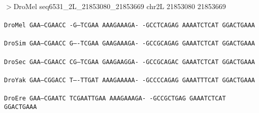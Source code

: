 \documentclass[11pt,twoside,reqno,a4paper]{article}
\begin{document}
\noindent
\newlength{\charwidth}$>$DroMel	seq6531\_2L\_21853080\_21853669	chr2L	21853080	21853669 \\
 \\
\texttt{DroMel	GAA--CGAACC	-G---TCGAA	AAAGAAAGA-	-GCCTCAGAG	AAAATCTCAT	GGACTGAAA\\
\hspace*{7\charwidth}\hspace*{1\charwidth}\hspace*{1\charwidth}\hspace*{1\charwidth}\hspace*{1\charwidth}\hspace*{1\charwidth}\\
DroSim	GAA--CGAACC	G----TCGAA	GAAGAAAGA-	-GCCGCAGAG	GAAATCTCAT	GGACTGAAA\\
\hspace*{7\charwidth}\hspace*{1\charwidth}\hspace*{1\charwidth}\hspace*{1\charwidth}\hspace*{1\charwidth}\hspace*{1\charwidth}\\
DroSec	GAA--CGAACC	CG---TCGAA	GAAGAAGGA-	-GCCGCAGAC	GAAATCTCAT	GGACTGAAA\\
\hspace*{7\charwidth}\hspace*{1\charwidth}\hspace*{1\charwidth}\hspace*{1\charwidth}\hspace*{1\charwidth}\hspace*{1\charwidth}\\
DroYak	GAA--CGGACC	T----TTGAT	AAAGAAAAA-	-GCCCCAGAG	GAAATTTCAT	GGACTGAAA\\
\hspace*{7\charwidth}\hspace*{1\charwidth}\hspace*{1\charwidth}\hspace*{1\charwidth}\hspace*{1\charwidth}\hspace*{1\charwidth}\\
DroEre	GAA--CGAATC	TCGAATTGAA	AAAGAAAGA-	-GCCGCTGAG	GAAATCTCAT	GGACTGAAA\\
\hspace*{7\charwidth}\hspace*{1\charwidth}\hspace*{1\charwidth}\hspace*{1\charwidth}\hspace*{1\charwidth}\hspace*{1\charwidth}\\
}
\end{document}
